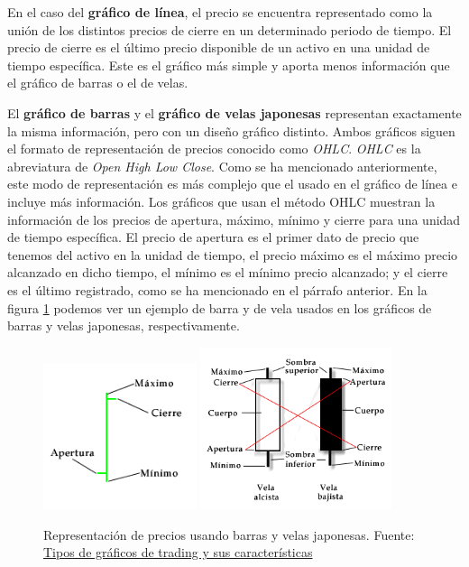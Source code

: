 En el caso del \textbf{gráfico de línea}, el precio se encuentra representado como la unión de los distintos precios de cierre en un determinado periodo de tiempo. El precio de cierre es el último precio disponible de un activo en una unidad de tiempo específica. Este es el gráfico más simple y aporta menos información que el gráfico de barras o el de velas. \newline

El \textbf{gráfico de barras} y el \textbf{gráfico de velas japonesas} representan exactamente la misma información, pero con un diseño gráfico distinto. Ambos gráficos siguen el formato de representación de precios conocido como \textit{OHLC}. \textit{OHLC} es la abreviatura de \textit{Open High Low Close}. Como se ha mencionado anteriormente, este modo de representación es más complejo que el usado en el gráfico de línea e incluye más información. Los gráficos que usan el método OHLC muestran la información de los precios de apertura, máximo, mínimo y cierre para una unidad de tiempo específica. El precio de apertura es el primer dato de precio que tenemos del activo en la unidad de tiempo, el precio máximo es el máximo precio alcanzado en dicho tiempo, el mínimo es el mínimo precio alcanzado; y el cierre es el último registrado, como se ha mencionado en el párrafo anterior. En la figura \ref{ohlc} podemos ver un ejemplo de barra y de vela usados en los gráficos de barras y velas japonesas, respectivamente. \newline

\begin{figure}[h]
	\includegraphics[width=0.4\textwidth]{imagenes/representacion_barra_OHLC.png} 
	\includegraphics[width=0.5\textwidth]{imagenes/representacion_vela_OHLC.png} 
	\caption{Representación de precios usando barras y velas japonesas. Fuente: \color{blue} \label{ohlc} \href{https://efxto.com/escuela/tipos-de-graficos-de-trading}{Tipos de gráficos de trading y sus características}} 
\end{figure} 

